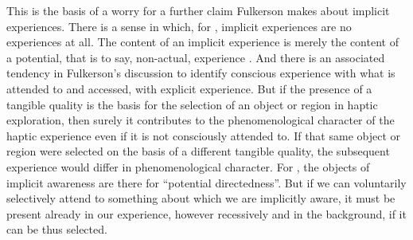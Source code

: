 This is the basis of a worry for a further claim Fulkerson makes about implicit experiences. There is a sense in which, for \citet[91]{Fulkerson:2014ek}, implicit experiences are no experiences at all. The content of an implicit experience is merely the content of a potential, that is to say, non-actual, experience \citep[95]{Fulkerson:2014ek}. And there is an associated tendency in Fulkerson's discussion to identify conscious experience with what is attended to and accessed, with explicit experience. But if the presence of a tangible quality is the basis for the selection of an object or region in haptic exploration, then surely it contributes to the phenomenological character of the haptic experience even if it is not consciously attended to. If that same object or region were selected on the basis of a different tangible quality, the subsequent experience would differ in phenomenological character. For \citet[95]{Fulkerson:2014ek}, the objects of implicit awareness are there for ``potential directedness''. But if we can voluntarily selectively attend to something about which we are implicitly aware, it must be present already in our experience, however recessively and in the background, if it can be thus selected.

